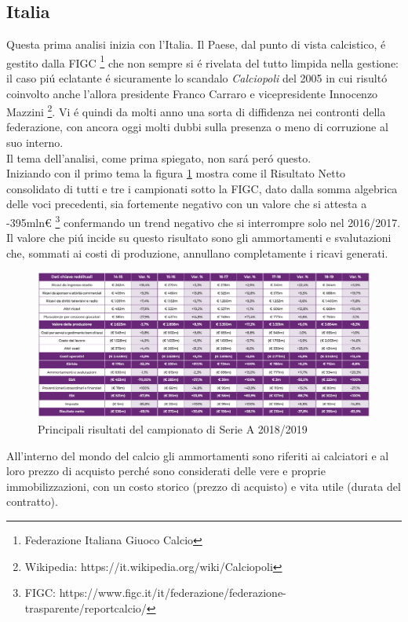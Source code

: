 \documentclass[
    corpo=11.5pt,
    oneside,
    evenboxes,
    tipotesi=triennale,
    stile=classica,
    oldstyle,
    autoretitolo,
    greek,
]{toptesi}
\begin{document}
\begin{interlinea}{1.5}
\subsection{Italia}
Questa prima analisi inizia con l'Italia. Il Paese, dal punto di vista calcistico, \'e gestito dalla FIGC \footnote{Federazione Italiana Giuoco Calcio}
che non sempre si \'e rivelata del tutto limpida nella gestione: il caso pi\'u eclatante \'e sicuramente lo scandalo \emph{Calciopoli} del
2005 in cui risult\'o coinvolto anche l'allora presidente Franco Carraro e vicepresidente Innocenzo Mazzini \footnote{Wikipedia: https://it.wikipedia.org/wiki/Calciopoli}.
Vi \'e quindi da molti anno una sorta di diffidenza nei contronti della federazione, con ancora oggi molti dubbi sulla presenza o meno di 
corruzione al suo interno.\\
Il tema dell'analisi, come prima spiegato, non sar\'a per\'o questo.\\
Iniziando con il primo tema la figura \ref{ris_italia} mostra come il Risultato Netto consolidato di tutti e tre i campionati 
sotto la FIGC, dato dalla somma algebrica delle voci precedenti, sia fortemente negativo con un valore che si attesta 
a -395mln€ \footnote{FIGC: https://www.figc.it/it/federazione/federazione-trasparente/reportcalcio/} confermando un trend negativo che
si interrompre solo nel 2016/2017.
Il valore che pi\'u incide su questo risultato sono gli ammortamenti e svalutazioni che, sommati ai costi di produzione, 
annullano completamente i ricavi generati. 
\begin{figure}
    \centering
    \includegraphics[scale=0.4]{img/ris_italia.png}
    \caption{Principali risultati del campionato di Serie A 2018/2019}
    \label{ris_italia}
\end{figure}
All'interno del mondo del calcio gli ammortamenti sono riferiti ai calciatori e al loro prezzo di acquisto perch\'e sono considerati delle 
vere e proprie immobilizzazioni, con un costo storico (prezzo di acquisto) e vita utile (durata del contratto). 

\end{interlinea}
\end{document}
